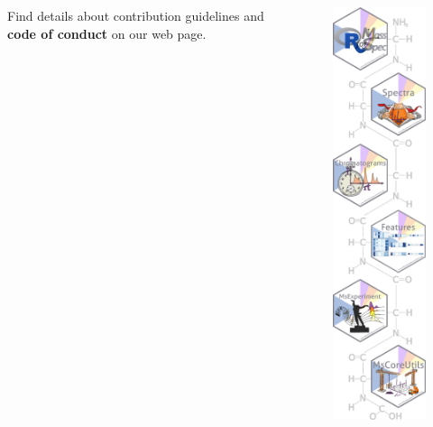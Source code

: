 \documentclass[final]{beamer}
\begin{document}
\begin{frame}[fragile]
\begin{columns}[T]
\begin{column}{.3\textwidth}
{        Find details about contribution guidelines and \textbf{code of
          conduct} on our web page.

      }

    \end{column}

    \begin{column}{.2\textwidth}
          \begin{figure}
            \centering
            \includegraphics[width=1\linewidth]{./figs/pkgs.pdf}
          \end{figure}


\end{column}
\end{columns}
\end{frame}
\end{document}
